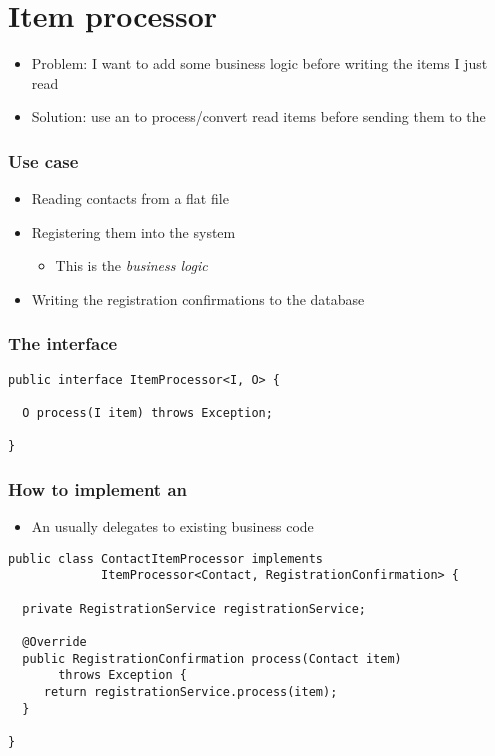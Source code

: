 \section{Item processor}

\begin{frame}
 \begin{itemize}
  \item Problem: I want to add some business logic before writing the items I just read
  \item Solution: use an  to process/convert read items 
  before sending them to the 
 \end{itemize}
\end{frame}

\begin{frame}
 \frametitle{Use case}
 \begin{itemize}
  \item Reading contacts from a flat file
  \item Registering them into the system
  \begin{itemize}
    \item This is the \em business logic
  \end{itemize}
  \item Writing the registration confirmations to the database
 \end{itemize}
\end{frame}


\begin{frame}[fragile]
\frametitle{The  interface}
\lstset{language=Java}
\begin{lstlisting}
public interface ItemProcessor<I, O> {

  O process(I item) throws Exception;

}
\end{lstlisting}
\end{frame}

\begin{frame}[fragile]
\frametitle{How to implement an }
\begin{itemize}
 \item An  usually delegates to existing business code
\end{itemize}

\lstset{language=Java}
\begin{lstlisting}
public class ContactItemProcessor implements
             ItemProcessor<Contact, RegistrationConfirmation> {

  private RegistrationService registrationService;

  @Override
  public RegistrationConfirmation process(Contact item)
       throws Exception {
     return registrationService.process(item);
  }

}
\end{lstlisting}
\end{frame}

